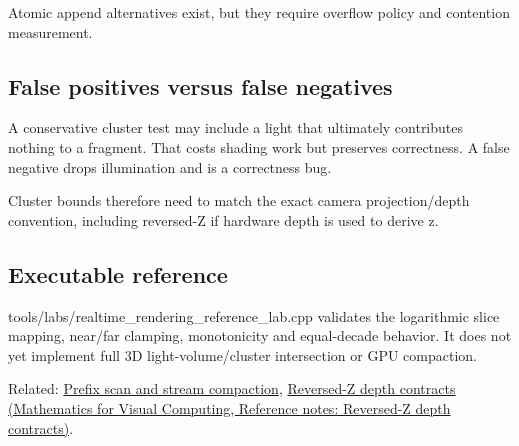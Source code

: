 Atomic append alternatives exist, but they require overflow policy and contention measurement.

\subsection{False positives versus false negatives}\label{appendix-b0efeb3f3648-false-positives-versus-false-negatives}

A conservative cluster test may include a light that ultimately contributes nothing to a fragment. That costs shading work but preserves correctness. A false negative drops illumination and is a correctness bug.

Cluster bounds therefore need to match the exact camera projection/depth convention, including reversed-Z if hardware depth is used to derive z.

\subsection{Executable reference}\label{appendix-b0efeb3f3648-executable-reference}

tools/labs/realtime\_rendering\_reference\_lab.cpp validates the logarithmic slice mapping, near/far clamping, monotonicity and equal-decade behavior. It does not yet implement full 3D light-volume/cluster intersection or GPU compaction.

Related: \hyperref[appendix-f2ee4d086415]{Prefix scan and stream compaction}, \href{../02-Mathematics-for-Visual-Computing/main.pdf\#nameddest=appendix-275ec8847057}{Reversed-Z depth contracts (Mathematics for Visual Computing, Reference notes: Reversed-Z depth contracts)}.
